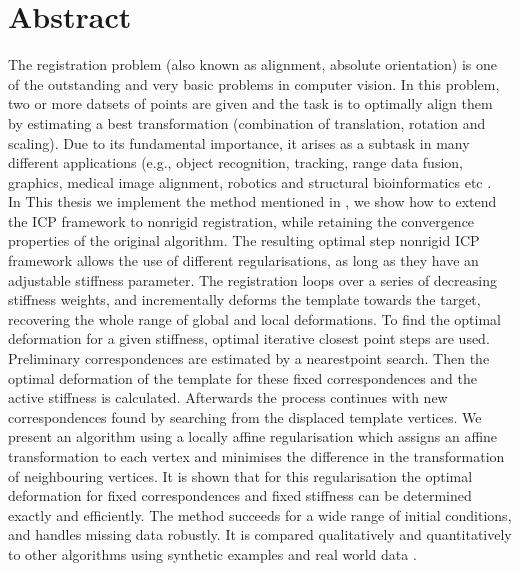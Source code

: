 \documentclass[../structure.tex]{subfiles}
\begin{document}
\chapter*{Abstract}
\hspace{.5cm} The registration problem (also known as alignment, absolute orientation) is one of the outstanding and very basic problems in computer vision. In this problem, two or more datsets of points are given and the task is to optimally align them by estimating a best transformation (combination of translation, rotation and scaling). Due to its fundamental importance, it arises as a subtask in many different applications (e.g., object recognition, tracking, range data fusion, graphics, medical image alignment, robotics and structural bioinformatics etc \cite{Li2007}.
\\In This thesis we implement the method mentioned in \cite{Amberg2007}, we show how to extend the ICP framework to nonrigid registration, while retaining the convergence properties of the original algorithm. The resulting optimal step nonrigid ICP framework allows the use of different regularisations, as long as they have an adjustable stiffness parameter. The registration loops over a series of decreasing stiffness weights, and incrementally deforms the template towards the target, recovering the whole range of global and local deformations. To find the optimal deformation for a given stiffness, optimal iterative closest point steps are used. Preliminary correspondences are estimated by a nearestpoint search. Then the optimal deformation of the template for these fixed correspondences and the active stiffness is calculated. Afterwards the process continues with new correspondences found by searching from the displaced template vertices. We present an algorithm using a locally affine regularisation which assigns an affine transformation to each vertex and minimises the difference in the transformation of neighbouring vertices. It is shown that for this regularisation the optimal deformation for fixed correspondences and fixed stiffness can be determined exactly and efficiently. The method succeeds for a wide range of initial conditions, and handles missing data robustly. It is compared qualitatively and quantitatively to other algorithms using synthetic examples and real world data \cite{Amberg2007}.
\end{document}
